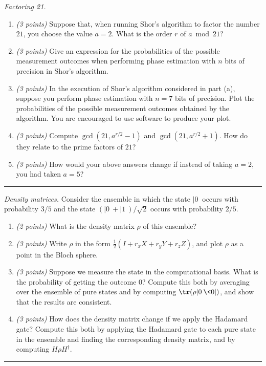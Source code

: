 \documentclass{article}
\newcommand{\shortbar}{\begin{center}\rule{5ex}{0.1pt}\end{center}}
\theoremstyle{plain}
\theoremstyle{definition}
\theoremstyle{remark}
\newenvironment{problem}[1]{\medskip\noindent{\bf Problem #1.~}}{\shortbar}
\newcommand{\points}[1]{\textit{(#1 points)}}
\begin{document}
\begin{problem}{2}
\emph{Factoring 21.}
\begin{enumerate}
  \item \points{3} Suppose that, when running Shor's algorithm to factor the number $21$, you choose the value $a=2$.
  What is the order $r$ of $a \bmod 21$?
  \item \points{3} Give an expression for the probabilities of the possible measurement outcomes when performing phase estimation with $n$ bits of precision in Shor's algorithm.
  \item \points{3} In the execution of Shor's algorithm considered in part (a), suppose you perform phase estimation with $n=7$ bits of precision.  Plot the probabilities of the possible measurement outcomes obtained by the algorithm.
You are encouraged to use software to produce your plot.
  \item \points{3} Compute $\gcd(21,a^{r/2}-1)$ and $\gcd(21,a^{r/2}+1)$.  How do they relate to the prime factors of $21$?
  \item \points{3} How would your above answers change if instead of taking $a=2$, you had taken $a=5$?
\end{enumerate}
\end{problem}

\begin{problem}{3}
\emph{Density matrices.}
Consider the ensemble in which the state $|0\>$ occurs with probability $3/5$ and the state $(|0\>+|1\>)/\sqrt2$ occurs with probability $2/5$.
\begin{enumerate}
  \item \points{2} What is the density matrix $\rho$ of this ensemble?
  \item \points{3} Write $\rho$ in the form $\frac{1}{2}(I + r_x X + r_y Y + r_z Z)$, and plot $\rho$ as a point in the Bloch sphere.
  \item \points{3} Suppose we measure the state in the computational basis.  What is the probability of getting the outcome $0$?  Compute this both by averaging over the ensemble of pure states and by computing $\tr(\rho|0\>\<0|)$, and show that the results are consistent.
  \item \points{3} How does the density matrix change if we apply the Hadamard gate?  Compute this both by applying the Hadamard gate to each pure state in the ensemble and finding the corresponding density matrix, and by computing $H \rho H^\dag$.
\end{enumerate}
\end{problem}
\end{document}
